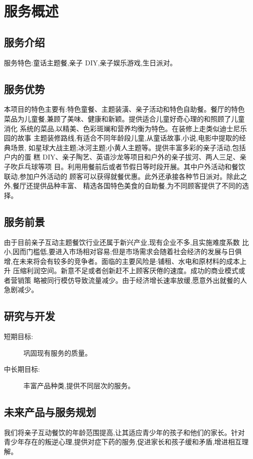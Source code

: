 \section{服务概述}

\subsection{服务介绍}
服务特色:童话主题餐,亲子 DIY,亲子娱乐游戏,生日派对。

\subsection{服务优势}
本项目的特色主要有:特色童餐、主题装潢、亲子活动和特色自助餐。餐厅的特色
菜品为儿童餐,兼顾了美味、健康和新颖。提供适合儿童好奇心理的和照顾了儿童消化
系统的菜品,以精美、色彩斑斓和营养均衡为特色。在装修上走类似迪士尼乐园的故事
主题装修路线,有适合不同年龄段儿童,从童话故事,小说,电影中提取的经典场景,
如星球大战主题;冰河主题;小黄人主题等。提供丰富多彩的亲子活动,包括户内的蛋
糕 DIY、亲子陶艺、英语沙龙等项目和户外的亲子拔河、两人三足、亲子吹乒乓球等项
目。利用用餐前后或者节假日等时段开展。其中户外活动和餐饮联动,参加户外活动的
顾客可以获得就餐优惠。此外还承接各种节日派对。除此之外,餐厅还提供品种丰富、
精选各国特色美食的自助餐,为不同顾客提供了不同的选择。

\subsection{服务前景}
由于目前亲子互动主题餐饮行业还属于新兴产业,现有企业不多,且实施难度系数
比小,因而门槛低,要进入市场相对容易;但是市场需求会随着社会经济的发展与日俱
增,在未来将会有较多的竞争者。面临的主要风险是:铺租、水电和原材料的成本上升
压缩利润空间。新意不足或者创新赶不上顾客厌倦的速度。成功的商业模式或者营销策
略被同行模仿导致流量减少。由于经济增长速率放缓,愿意外出就餐的人急剧减少。

\subsection{研究与开发}
\begin{description}
        \item[短期目标:] 巩固现有服务的质量。
        \item[中长期目标:] 丰富产品种类,提供不同层次的服务。
\end{description}

\subsection{未来产品与服务规划}
我们将亲子互动餐饮的年龄范围提高,让其适应青少年的孩子和他们的家长。针对
青少年存在的叛逆心理,提供对症下药的服务,促进家长和孩子缓和矛盾,增进相互理
解。

